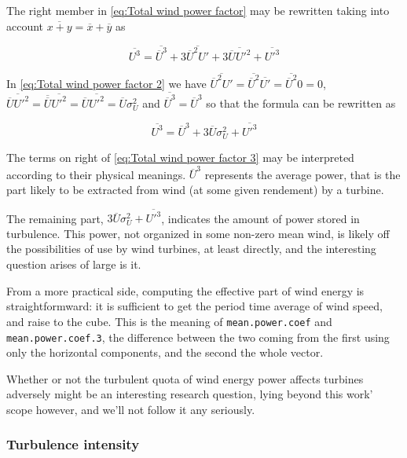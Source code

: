 \documentclass[a4paper,10pt]{book}
\begin{document}
The right member in \ref{eq:Total wind power factor} may be rewritten taking into account $\overline{x+y} = \overline{x}+\overline{y}$ as

\begin{equation}\label{eq:Total wind power factor 2}
  \overline{U^{3}} = \overline{\overline{U}^{3}} + 3 \overline{\overline{U}^{2} U'} + 3 \overline{\overline{U} U'^{2}} + \overline{U'^{3}}
\end{equation}

In \ref{eq:Total wind power factor 2} we have $\overline{\overline{U}^{2} U'} = \overline{\overline{U}^2} \overline{U'} = \overline{\overline{U}^2} 0 = 0$, $\overline{\overline{U} U'^{2}} = \overline{\overline{U}} \overline{U'^{2}} = \overline{U} \overline{U'^{2}} = \overline{U} \sigma^{2}_{U}$ and $\overline{\overline{U}^{3}} = \overline{U}^{3}$ so that the formula can be rewritten as

\begin{equation}\label{eq:Total wind power factor 3}
  \overline{U^{3}} = \overline{U}^{3} + 3 \overline{U} \sigma^{2}_{U} + \overline{U'^{3}}
\end{equation}

The terms on right of \ref{eq:Total wind power factor 3} may be interpreted according to their physical meanings. $\overline{U}^{3}$ represents the average power, that is the part likely to be extracted from wind (at some given rendement) by a turbine.

The remaining part, $3 \overline{U} \sigma^{2}_{U} + \overline{U'^{3}}$, indicates the amount of power stored in turbulence. This power, not organized in some non-zero mean wind, is likely off the possibilities of use by wind turbines, at least directly, and the interesting question arises of large is it.

From a more practical side, computing the effective part of wind energy is straightformward: it is sufficient to get the period time average of wind speed, and raise to the cube. This is the meaning of \verb|mean.power.coef| and \verb|mean.power.coef.3|, the difference between the two coming from the first using only the horizontal components, and the second the whole vector.

Whether or not the turbulent quota of wind energy power affects turbines adversely might be an interesting research question, lying beyond this work' scope however, and we'll not follow it any seriously.


\subsubsection{Turbulence intensity}
\end{document}

